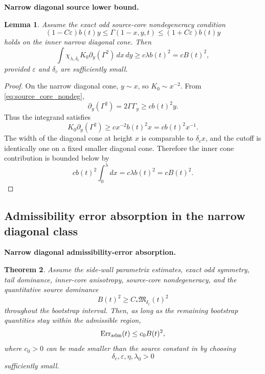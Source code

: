 \documentclass[11pt]{amsart}
\newtheorem{theorem}{Theorem}[section]
\newtheorem{lemma}[theorem]{Lemma}
\begin{document}
\medskip
\noindent\textbf{Narrow diagonal source lower bound.}
\begin{lemma}\label{lem:diag_source_lower}
Assume the exact odd source-core nondegeneracy condition
\begin{equation}\label{eq:source_core_nondeg}
(1-C\varepsilon)b(t)y
\le
\Gamma(1-x,y,t)
\le
(1+C\varepsilon)b(t)y
\end{equation}
holds on the inner narrow diagonal cone.  Then
\begin{equation}\label{eq:diag_source_lower}
\int \chi_{\lambda,\delta_c}K_0\partial_y(\Gamma^2)\,dx\,dy
\ge
c\lambda b(t)^2
=cB(t)^2,
\end{equation}
provided \(\varepsilon\) and \(\delta_c\) are sufficiently small.
\end{lemma}

\begin{proof}
On the narrow diagonal cone, \(y\sim x\), so \(K_0\sim x^{-2}\).  From \eqref{eq:source_core_nondeg},
\[
\partial_y(\Gamma^2)=2\Gamma\Gamma_y
\ge c b(t)^2y.
\]
Thus the integrand satisfies
\[
K_0\partial_y(\Gamma^2)\ge c x^{-2}b(t)^2x=c b(t)^2x^{-1}.
\]
The width of the diagonal cone at height \(x\) is comparable to \(\delta_c x\), and the cutoff is identically one on a fixed smaller diagonal cone.  Therefore the inner cone contribution is bounded below by
\[
 c b(t)^2\int_0^\lambda dx=c\lambda b(t)^2=cB(t)^2.
\]
\end{proof}

\subsection{Admissibility error absorption in the narrow diagonal class}

\medskip
\noindent\textbf{Narrow diagonal admissibility-error absorption.}
\begin{theorem}\label{thm:narrow_admissibility_absorption}
Assume the side-wall parametrix estimates, exact odd symmetry, tail dominance, inner-core anisotropy, source-core nondegeneracy, and the quantitative source dominance
\begin{equation}\label{eq:source_dominance_initial}
B(t)^2\ge C_*\mathfrak M_{\delta_c}(t)^2
\end{equation}
throughout the bootstrap interval.  Then, as long as the remaining bootstrap quantities stay within the admissible region,
\begin{equation}\label{eq:narrow_error_absorption}
\operatorname{Err}_{\rm adm}(t)
\le
c_0 B(t)^2,
\end{equation}
where \(c_0>0\) can be made smaller than the source constant in  by choosing
\[
\delta_c,\varepsilon,\eta,\lambda_0>0
\]
sufficiently small.
\end{theorem}
\end{document}
